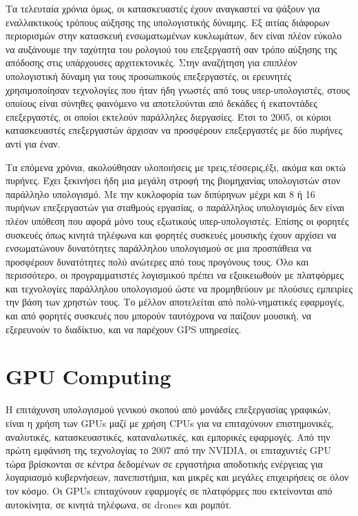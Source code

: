 Τα τελευταία χρόνια όμως, οι κατασκευαστές έχουν αναγκαστεί να ψάξουν για εναλλακτικούς τρόπους αύξησης της υπολογιστικής δύναμης. Εξ αιτίας διάφορων περιορισμών στην κατασκευή ενσωματωμένων κυκλωμάτων, δεν είναι πλέον εύκολο να αυξάνουμε την ταχύτητα του ρολογιού του επεξεργαστή σαν τρόπο αύξησης της απόδοσης στις υπάρχουσες αρχιτεκτονικές. Στην αναζήτηση για επιπλέον υπολογιστική δύναμη για τους προσωπικούς επεξεργαστές, οι ερευνητές χρησιμοποίησαν τεχνολογίες που ήταν ήδη γνωστές από τους υπερ-υπολογιστές, στους οποίους είναι σύνηθες φαινόμενο να αποτελούνται από δεκάδες ή εκατοντάδες επεξεργαστές, οι οποίοι εκτελούν παράλληλες διεργασίες. Έτσι το 2005, οι κύριοι κατασκευαστές επεξεργαστών άρχισαν να προσφέρουν επεξεργαστές με δύο πυρήνες αντί για έναν. 

Τα επόμενα χρόνια, ακολούθησαν υλοποιήσεις με τρεις,τέσσερις,έξι, ακόμα και οκτώ πυρήνες. Έχει ξεκινήσει ήδη μια μεγάλη στροφή της βιομηχανίας υπολογιστών στον παράλληλο υπολογισμό. Με την κυκλοφορία των διπύρηνων μέχρι και 8 ή 16 πυρήνων επεξεργαστών για σταθμούς εργασίας, ο παράλληλος υπολογισμός δεν είναι πλέον υπόθεση που αφορά μόνο τους εξωτικούς υπερ-υπολογιστές. Επίσης οι φορητές συσκευές όπως κινητά τηλέφωνα και φορητές συσκευές μουσικής έχουν αρχίσει να ενσωματώνουν δυνατότητες παράλληλου υπολογισμού σε μια προσπάθεια να προσφέρουν δυνατότητες πολύ ανώτερες από τους προγόνους τους. Όλο και περισσότερο, οι προγραμματιστές λογισμικού πρέπει να εξοικειωθούν με πλατφόρμες και τεχνολογίες παράλληλου υπολογισμού ώστε να προμηθεύουν με πλούσιες εμπειρίες την βάση των χρηστών τους. Το μέλλον αποτελείται από πολύ-νηματικές εφαρμογές, και από φορητές συσκευές που μπορούν ταυτόχρονα να παίζουν μουσική, να εξερευνούν το διαδίκτυο, και να παρέχουν GPS υπηρεσίες.\cite{gpgpu-3}
\section*{GPU Computing}

Η επιτάχυνση υπολογισμού γενικού σκοπού από μονάδες επεξεργασίας γραφικών, είναι η χρήση των GPUs μαζί με χρήση CPUs για να επιταχύνουν επιστημονικές, αναλυτικές, κατασκευαστικές, καταναλωτικές, και εμπορικές εφαρμογές. Από την πρώτη εμφάνιση της τεχνολογίας το 2007 από την NVIDIA, οι επιταχυντές GPU τώρα βρίσκονται σε κέντρα δεδομένων σε εργαστήρια αποδοτικής ενέργειας για λογαριασμό κυβερνήσεων, πανεπιστήμια, και μικρές και μεγάλες επιχειρήσεις σε όλον τον κόσμο. Οι GPUs επιταχύνουν εφαρμογές σε πλατφόρμες που εκτείνονται από αυτοκίνητα, σε κινητά τηλέφωνα, σε drones και ρομπότ.

